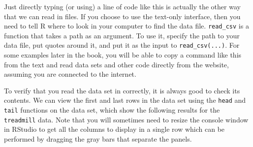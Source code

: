 \documentclass[
]{book}
\begin{document}
\indent Just directly typing (or using) a line of code like this is actually the
other way that we can read in
files. If you choose to use the text-only interface, then you need to tell R
where to look in your computer to find the data file. \texttt{read\_csv} is a
function that takes a path as an argument. To use it, specify the path to
your data file, put quotes around it, and put it as the input to
\texttt{read\_csv(...)}. For some examples later in the book, you will be able to
copy a command like this from the text and read data sets and other
code directly from the website, assuming you are connected to the
internet.

\indent To verify that you read the data set in correctly, it is always good to check
its contents. We can view the first and last rows in the data set using the
\texttt{head} and \texttt{tail} functions on the data set, which show the following
results for the
\texttt{treadmill} data. Note that you will sometimes need to resize the console
window in RStudio to get all the columns to display
in a single row which can be performed by dragging the gray bars that separate
the panels.

\small
\end{document}
